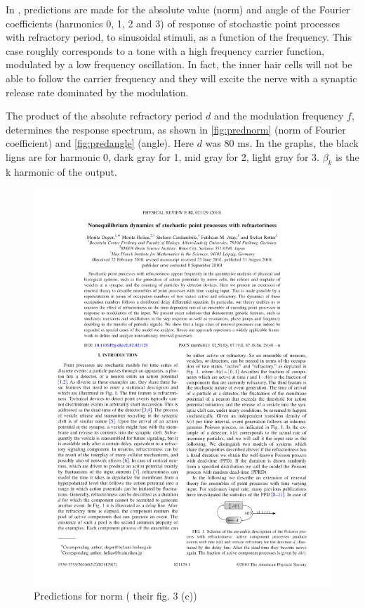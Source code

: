 In \cite{Deger}, predictions are made for the absolute value (norm) and angle of the Fourier coefficients 
(harmonics 0, 1, 2 and 3) of response of stochastic point processes with refractory period,
to sinusoidal stimuli, as a function of the frequency. 
This case roughly corresponds to a tone with a high frequency carrier function, 
modulated by a low frequency oscillation. 
In fact, the inner hair cells will not be able to follow the carrier frequency 
and they will excite the nerve with a synaptic release rate dominated by the modulation.

The product of the absolute refractory period $d$ and the modulation frequency $f$,
determines the response spectrum, as shown in \autoref{fig:prednorm} (norm of Fourier coefficient) and 
\autoref{fig:predangle} (angle). Here $d$ was 80 ms. 
In the graphs, the black ligns are for harmonic 0, dark gray for 1, mid gray for 2, light gray for 3.
$\beta_k$ is the k harmonic of the output. 



\begin{figure}[h]
	\centering
	\includegraphics*[page=4,viewport=308 567 441 617]{images/Deger2010.pdf} %
	\caption{Predictions for norm (\cite{Deger}  their fig. 3 (c))}
	\label{fig:prednorm}
\end{figure}


